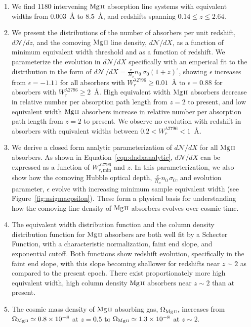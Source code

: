 \begin{enumerate}
\item We find 1180 intervening ${\hbox{{\rm Mg}\kern 0.1em{\sc ii}}}$ absorption line systems with equivalent widths from $0.003$~{\AA} to $8.5$~{\AA}, and redshifts spanning $0.14 \le z \le 2.64$.
\item We present the distributions of the number of absorbers per unit redshift, $d\mathcal{N}\!/dz$, and the comoving ${\hbox{{\rm Mg}\kern 0.1em{\sc ii}}}$ line density, $d\mathcal{N}\!/dX$, as a function of minimum equivalent width threshold and as a function of redshift. We parameterize the evolution in $d\mathcal{N}\!/dX$ specifically with an emperical fit to the distribution in the form of $d\mathcal{N}\,/dX = \frac{c}{H_o}n_0\,\sigma_0(1 + z)^{\epsilon}$, showing $\epsilon$ increases from $\epsilon=-1.11$ for all absorbers with $W_r^{\lambda2796} \ge 0.01$~{\AA} to $\epsilon=0.88$ for absorbers with $W_r^{\lambda2796} \ge 2$~{\AA}. High equivalent width ${\hbox{{\rm Mg}\kern 0.1em{\sc ii}}}$ absorbers decrease in relative number per absorption path length from $z = 2$ to present, and low equivalent width ${\hbox{{\rm Mg}\kern 0.1em{\sc ii}}}$ absorbers increase in relative number per absorption path length from $z = 2$ to present. We observe no evolution with redshift in absorbers with equivalent widths between $0.2 < W_r^{\lambda2796} < 1$~{\AA}.
\item We derive a closed form analytic parameterization of $d\mathcal{N}\!/dX$ for all ${\hbox{{\rm Mg}\kern 0.1em{\sc ii}}}$ absorbers. As shown in Equation~\ref{eqn:dndxanalytic}, $d\mathcal{N}\!/dX$ can be expressed as a function of $W_{r,\mathrm{min}}^{\lambda2796}$ and $z$. In this parameterization, we also show how the comoving Hubble optical depth, $\frac{c}{H_o}n_0\,\sigma_0$, and evolution parameter, $\epsilon$ evolve with increasing minimum sample equivalent width (see Figure~\ref{fig:nsigmaepsilon}). These form a physical basis for understanding how the comoving line density of ${\hbox{{\rm Mg}\kern 0.1em{\sc ii}}}$ absorbers evolves over cosmic time.
\item The equivalent width distribution function and the column density distribution function for ${\hbox{{\rm Mg}\kern 0.1em{\sc ii}}}$ absorbers are both well fit by a Schecter Function, with a characteristic normalization, faint end slope, and exponential cutoff. Both functions show redshift evolution, specifically in the faint end slope, with this slope becoming shallower for redshifts near $z \sim 2$ as compared to the present epoch. There exist proportionately more high equivalent width, high column density ${\hbox{{\rm Mg}\kern 0.1em{\sc ii}}}$ absorbers near $z \sim 2$ than at present.
\item The cosmic mass density of ${\hbox{{\rm Mg}\kern 0.1em{\sc ii}}}$ absorbing gas, $\Omega_{\hbox{\scriptsize {\hbox{{\rm Mg}\kern 0.1em{\sc ii}}}}}$, increases from $\Omega_{\hbox{\scriptsize {\hbox{{\rm Mg}\kern 0.1em{\sc ii}}}}} \simeq 0.8\times10^{-8}$ at $z = 0.5$ to $\Omega_{\hbox{\scriptsize {\hbox{{\rm Mg}\kern 0.1em{\sc ii}}}}} \simeq 1.3\times10^{-8}$ at $z \sim 2$.

\end{enumerate}
